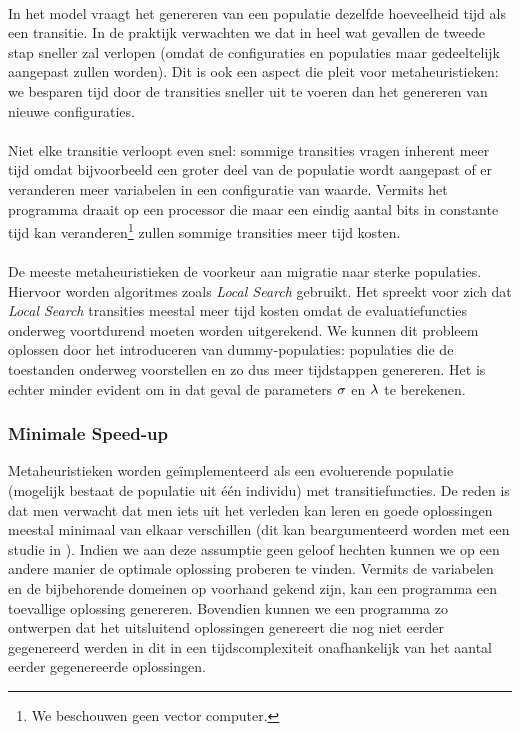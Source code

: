 \paragraph{}
In het model vraagt het genereren van een populatie dezelfde hoeveelheid tijd als een transitie. In de praktijk verwachten we dat in heel wat gevallen de tweede stap sneller zal verlopen (omdat de configuraties en populaties maar gedeeltelijk aangepast zullen worden). Dit is ook een aspect die pleit voor metaheuristieken: we besparen tijd door de transities sneller uit te voeren dan het genereren van nieuwe configuraties.

\paragraph{}
Niet elke transitie verloopt even snel: sommige transities vragen inherent meer tijd omdat bijvoorbeeld een groter deel van de populatie wordt aangepast of er veranderen meer variabelen in een configuratie van waarde. Vermits het programma draait op een processor die maar een eindig aantal bits in constante tijd kan veranderen\footnote{We beschouwen geen vector computer.} zullen sommige transities meer tijd kosten.

\paragraph{}
De meeste metaheuristieken de voorkeur aan migratie naar sterke populaties. Hiervoor worden algoritmes zoals \emph{Local Search} gebruikt. Het spreekt voor zich dat \emph{Local Search} transities meestal meer tijd kosten omdat de evaluatiefuncties onderweg voortdurend moeten worden uitgerekend. We kunnen dit probleem oplossen door het introduceren van dummy-populaties: populaties die de toestanden onderweg voorstellen en zo dus meer tijdstappen genereren. Het is echter minder evident om in dat geval de parameters $\sigma$ en $\lambda$ te berekenen.

\subsubsection{Minimale Speed-up}

Metaheuristieken worden ge\"implementeerd als een evoluerende populatie (mogelijk bestaat de populatie uit \'e\'en individu) met transitiefuncties. De reden is dat men verwacht dat men iets uit het verleden kan leren en goede oplossingen meestal minimaal van elkaar verschillen (dit kan beargumenteerd worden met een studie in \cite{Kalnis02viewselection}). Indien we aan deze assumptie geen geloof hechten kunnen we op een andere manier de optimale oplossing proberen te vinden. Vermits de variabelen en de bijbehorende domeinen op voorhand gekend zijn, kan een programma een toevallige oplossing genereren. Bovendien kunnen we een programma zo ontwerpen dat het uitsluitend oplossingen genereert die nog niet eerder gegenereerd werden in dit in een tijdscomplexiteit onafhankelijk van het aantal eerder gegenereerde oplossingen.
